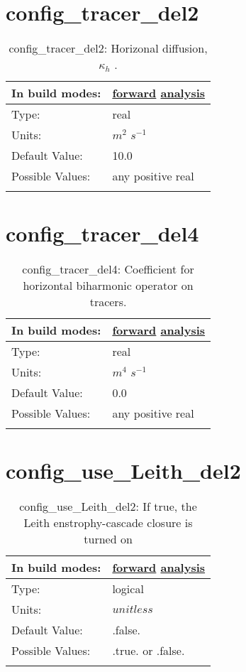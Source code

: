 \section[config\_tracer\_del2]{config\_tracer\_del2}
\label{sec:nm_sec_config_tracer_del2}
\begin{center}
\begin{longtable}{| p{2.0in} || p{4.0in} |}
    \hline
    In build modes: & \hyperref[subsec:forward_nm_tab_hmix_del2]{forward} \hyperref[subsec:analysis_nm_tab_hmix_del2]{analysis} \\
    \hline
    Type: & real \\
    \hline
    Units: & $m^2$ $s^{-1}$ \\
    \hline
    Default Value: & 10.0 \\
    \hline
    Possible Values: & any positive real \\
    \hline
    \caption{config\_tracer\_del2:  Horizonal diffusion,  $\kappa_h$ .}
\end{longtable}
\end{center}
\section[config\_tracer\_del4]{config\_tracer\_del4}
\label{sec:nm_sec_config_tracer_del4}
\begin{center}
\begin{longtable}{| p{2.0in} || p{4.0in} |}
    \hline
    In build modes: & \hyperref[subsec:forward_nm_tab_hmix_del4]{forward} \hyperref[subsec:analysis_nm_tab_hmix_del4]{analysis} \\
    \hline
    Type: & real \\
    \hline
    Units: & $m^4$ $s^{-1}$ \\
    \hline
    Default Value: & 0.0 \\
    \hline
    Possible Values: & any positive real \\
    \hline
    \caption{config\_tracer\_del4: Coefficient for horizontal biharmonic operator on tracers.}
\end{longtable}
\end{center}
\section[config\_use\_Leith\_del2]{config\_use\_Leith\_del2}
\label{sec:nm_sec_config_use_Leith_del2}
\begin{center}
\begin{longtable}{| p{2.0in} || p{4.0in} |}
    \hline
    In build modes: & \hyperref[subsec:forward_nm_tab_hmix_Leith]{forward} \hyperref[subsec:analysis_nm_tab_hmix_Leith]{analysis} \\
    \hline
    Type: & logical \\
    \hline
    Units: & $unitless$ \\
    \hline
    Default Value: & .false. \\
    \hline
    Possible Values: & .true. or .false. \\
    \hline
    \caption{config\_use\_Leith\_del2: If true, the Leith enstrophy-cascade closure is turned on}
\end{longtable}
\end{center}
